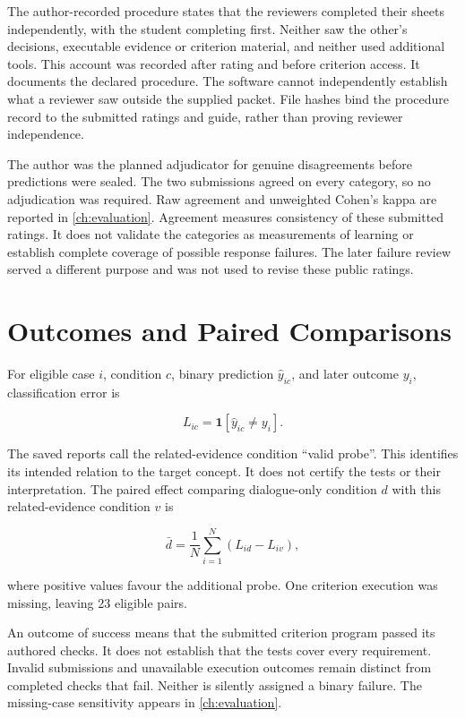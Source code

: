 The author-recorded procedure states that the reviewers completed their sheets independently, with the student completing
first. Neither saw the other's decisions, executable evidence or criterion material, and neither used additional tools.
This account was recorded after rating and before criterion access. It documents the declared procedure. The software cannot
independently establish what a reviewer saw outside the supplied packet. File hashes bind the procedure record to the submitted
ratings and guide, rather than proving reviewer independence.

The author was the planned adjudicator for genuine disagreements before predictions were sealed. The two submissions agreed
on every category, so no adjudication was required. Raw agreement and unweighted Cohen's kappa are reported in
\cref{ch:evaluation}. Agreement measures consistency of these submitted ratings. It does not validate the categories as
measurements of learning or establish complete coverage of possible response failures. The later failure review served a
different purpose and was not used to revise these public ratings.

\section{Outcomes and Paired Comparisons}

For eligible case $i$, condition $c$, binary prediction $\hat y_{ic}$, and later outcome $y_i$, classification error is

\begin{equation}
  L_{ic}=\mathbf{1}[\hat y_{ic}\neq y_i].
\end{equation}

The saved reports call the related-evidence condition ``valid probe''. This identifies its intended relation to the target
concept. It does not certify the tests or their interpretation. The paired effect comparing dialogue-only condition $d$ with
this related-evidence condition $v$ is

\begin{equation}
  \bar d=\frac{1}{N}\sum_{i=1}^{N}(L_{id}-L_{iv}),
\end{equation}

where positive values favour the additional probe. One criterion execution was missing, leaving 23 eligible pairs.

An outcome of success means that the submitted criterion program passed its authored checks. It does not establish that
the tests cover every requirement. Invalid submissions and unavailable execution outcomes remain distinct from completed
checks that fail. Neither is silently assigned a binary failure. The missing-case sensitivity appears in \cref{ch:evaluation}.

